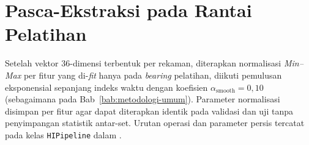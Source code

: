 \section{Pasca-Ekstraksi pada Rantai Pelatihan}
\label{lamp:fitur_post}

Setelah vektor $36$-dimensi terbentuk per rekaman, diterapkan
normalisasi \emph{Min--Max} per fitur yang di-\emph{fit} hanya pada
\emph{bearing} pelatihan, diikuti pemulusan eksponensial sepanjang indeks
waktu dengan koefisien $\alpha_{\mathrm{smooth}} = 0{,}10$
(sebagaimana pada Bab~\ref{bab:metodologi-umum}).
Parameter normalisasi disimpan per fitur agar dapat diterapkan identik
pada validasi dan uji tanpa penyimpangan statistik antar-set.
Urutan operasi dan parameter persis tercatat pada kelas
\texttt{HIPipeline} dalam .
